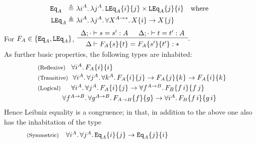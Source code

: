 \begin{align*}
\mathtt{Eq}_A ~~\triangleq&~
	\lambda i^A.\, \lambda j^A.\, 
	\mathtt{LEq}_A\{i\} \{j\} \times \mathtt{LEq}_A\{j\} \{i\}
\quad \text{where} \\
\mathtt{LEq}_A \triangleq&~
	\lambda i^A.\, \lambda j^A.\, \forall X^{A\to*}.\, X\{i\}\to X\{j\}
\end{align*}
For $F_A\in\{\mathtt{Eq}_A,\mathtt{LEq}_A\}$, 
$\begin{array}{c}
\Delta;\cdot\vdash s=s':A\enspace\quad \Delta;\cdot\vdash t=t':A
\\ \hline \\[-3mm]
\Delta\vdash F_A \{s\} \{t\} = F_A\{s'\}\{t'\}:*
\end{array}.$ \vspace*{3pt} \\
As further basic properties, the following types are inhabited:
\[\!\!\!\!\begin{array}{l}
\text{\small(Reflexive)} 
~~\,
\forall i^A.\,F_A\s{i}\s{i}
\\[1mm]
\text{\small(Transitive)} 
~~
\forall i^A.\,\forall j^A.\,\forall k^A.\,
  F_A\s{i}\s{j}\to F_A\s{j}\s{k}\to F_A\s{i}\s{k}
\\[1mm]
\text{\small(Logical)}
\quad~\, \forall i^A.\,\forall j^A.\, 
F_A\s{i}\s{j}\to \forall f^{A\to B}.\, F_B\s{f\,i}\s{f\,j}
\\[1mm]
\qquad\qquad~~~
\forall f^{A\to B}.\,\forall g^{A\to B}.\, 
F_{A\to B}\s{f}\s{g}\to 
\forall i^A.\, F_B\s{f\,i}\s{g\,i}
\end{array}\]
Hence Leibniz equality is a congruence; in that, in addition to the above
one also has the inhabitation of the type
\[\!\!\!\!\begin{array}{l}
\text{\small(Symmetric)} 
\quad
\forall i^A.\,\forall j^A.\,
  \Eq_A\s{i}\s{j}\to\Eq_A\s{j}\s{i}
\end{array}\qquad\qquad\qquad\qquad\qquad\]

